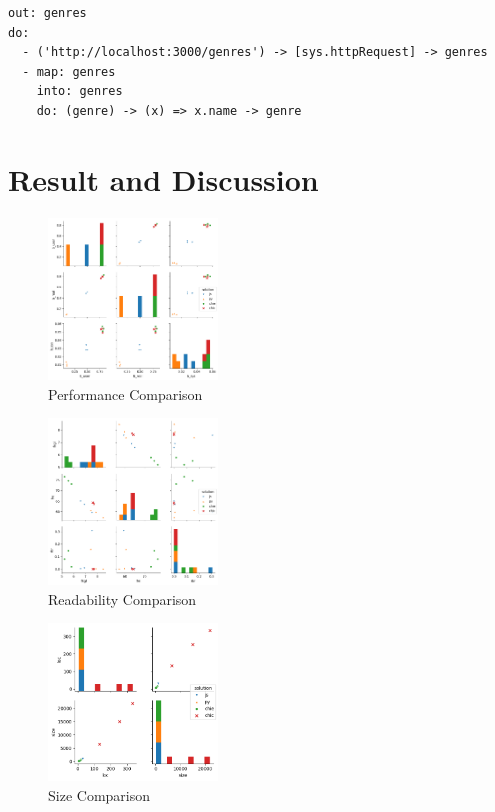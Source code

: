 \documentclass[conference]{IEEEtran}
\begin{document}
\begin{lstlisting}[caption=CHIML Solution for problem-g, label=chimlSolution, basicstyle=\footnotesize, breaklines=true]
out: genres
do:
  - ('http://localhost:3000/genres') -> [sys.httpRequest] -> genres
  - map: genres
    into: genres
    do: (genre) -> (x) => x.name -> genre
\end{lstlisting}


\section{Result and Discussion}

\begin{figure}
	\includegraphics[width=0.4\textwidth]
		{benchmark/benchmark.png}
	\caption{Performance Comparison}
	\label{fig:performanceComparison}
\end{figure}

\begin{figure}
	\includegraphics[width=0.4\textwidth]
		{benchmark/readability.png}
	\caption{Readability Comparison}
	\label{fig:readabilityComparison}
\end{figure}

\begin{figure}
	\includegraphics[width=0.4\textwidth]
		{benchmark/size.png}
	\caption{Size Comparison}
	\label{fig:sizeComparison}
\end{figure}
\end{document}

